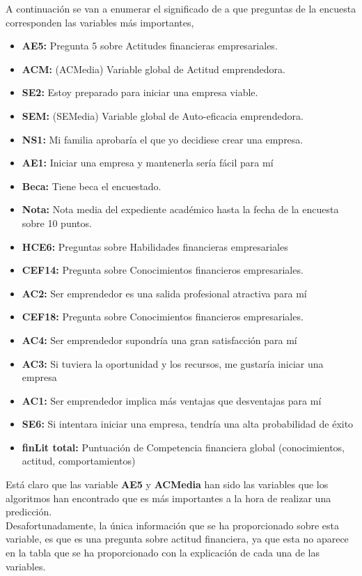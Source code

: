 A continuación se van a enumerar el significado de a que preguntas de la encuesta corresponden las variables más importantes,
\begin{itemize}
	\item \textbf{AE5:} Pregunta 5 sobre Actitudes financieras empresariales. 
	\item \textbf{ACM:} (ACMedia) Variable global de Actitud emprendedora.
	\item \textbf{SE2:} Estoy preparado para iniciar una empresa viable.
	\item \textbf{SEM:} (SEMedia) Variable global de Auto-eficacia emprendedora.
	\item \textbf{NS1:} Mi familia aprobaría el que yo decidiese crear una empresa. 
	\item \textbf{AE1:} Iniciar una empresa y mantenerla sería fácil para mí
	\item \textbf{Beca:} Tiene beca el encuestado.
	\item \textbf{Nota:} Nota media del expediente académico hasta la fecha de la encuesta sobre 10 puntos.
	\item \textbf{HCE6:} Preguntas sobre Habilidades financieras empresariales
	\item \textbf{CEF14:} Pregunta sobre Conocimientos financieros empresariales.
	\item \textbf{AC2:} Ser emprendedor es una salida profesional atractiva para mí
	\item \textbf{CEF18:} Pregunta sobre Conocimientos financieros empresariales.
	\item \textbf{AC4:} Ser emprendedor supondría una gran satisfacción para mí
	\item \textbf{AC3:} Si tuviera la oportunidad y los recursos, me gustaría iniciar una empresa
	\item \textbf{AC1:} Ser emprendedor implica más ventajas que desventajas para mí
	\item \textbf{SE6:} Si intentara iniciar una empresa, tendría una alta probabilidad de éxito
	\item \textbf{finLit total:} Puntuación de Competencia financiera global (conocimientos, actitud, comportamientos)
\end{itemize}
Está claro que las variable \textbf{AE5} y \textbf{ACMedia} han sido las variables que los algoritmos han encontrado que es más importantes a la hora de realizar una predicción.\\
Desafortunadamente, la única información que se ha proporcionado sobre esta variable, es que es una pregunta sobre actitud financiera, ya que esta no aparece en la tabla que se ha proporcionado con la explicación de cada una de las variables.\\
